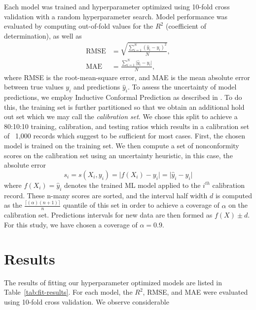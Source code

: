 \documentclass[journal,article,submit,pdftex,moreauthors]{Definitions/mdpi}
\begin{document}
Each model was trained and hyperparameter optimized using 10-fold cross validation with a random hyperparameter search.  Model performance was evaluated by computing out-of-fold values for the $R^2$ (coefficient of determination), as well as
\begin{align}
    \text{RMSE} &= \sqrt{\frac{\sum\limits_{i=1}^N (\hat{y}_i-y_i)^2}{N}}, \\
    \text{MAE} &= \frac{\sum\limits_{i=1}^N \lvert \hat{y}_i - y_i \vert}{N},
\end{align}
where RMSE is the root-mean-square error, and MAE is the mean absolute error between true values $y_i$ and predictions $\hat{y}_i$. To assess the uncertainty of model predictions, we employ Inductive Conformal Prediction as described in \cite{conformal-prediction-1, conformal-prediction-2, conformal-prediction-3, conformal-prediction-4}. To do this, the training set is further partitioned so that we obtain an additional hold out set which we may call the \textit{calibration set}. We chose this split to achieve a 80:10:10 training, calibration, and testing ratios which results in a calibration set of ~1,000 records which \cite{conformal-prediction-2} suggest to be sufficient for most cases. First, the chosen model is trained on the training set. We then compute a set of nonconformity scores on the calibration set using an uncertainty heuristic, in this case, the absolute error
\begin{equation}
    s_i = s(X_i, y_i) = \lvert f(X_i) - y_i \rvert = \lvert \hat{y}_i - y_i \rvert
\end{equation}
where $f(X_i)=\hat{y}_i$ denotes the trained ML model applied to the $i^{th}$ calibration record. These n-many scores are sorted, and the interval half width $d$ is computed as the $\frac{\lceil(\alpha)(n+1) \rceil}{n}$ quantile of this set in order to achieve a coverage of $\alpha$ on the calibration set. Predictions intervals for new data are then formed as $f(X)\pm d$. For this study, we have chosen a coverage of $\alpha=0.9$.

\section{Results}

The results of fitting our hyperparameter optimized models are listed in Table~\ref{tab:fit-results}. For each model, the $R^2$, RMSE, and MAE were evaluated using 10-fold cross validation. We observe considerable 
\end{document}
